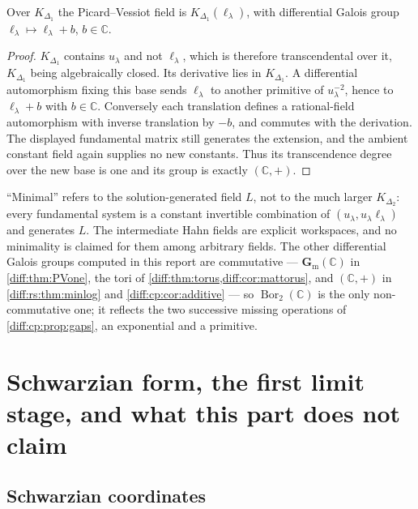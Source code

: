 \documentclass[11pt,letterpaper]{article}
\numberwithin{equation}{section}
\theoremstyle{definition}
\theoremstyle{remark}
\newcommand{\C}{\mathbb C}
\newcommand{\gm}{\mathbf G_{\mathrm m}}
\newcommand{\Bor}{\operatorname{Bor}}
\begin{document}
\begin{corollary}
\label{diff:cp:cor:additive}
Over $K_{\Delta_{1}}$ the Picard--Vessiot field is $K_{\Delta_{1}}(\ell_{\lambda})$,
with differential Galois group $\ell_{\lambda}\mapsto\ell_{\lambda}+b$, $b\in\C$.
\end{corollary}
\begin{proof}
$K_{\Delta_{1}}$ contains $u_{\lambda}$ and not $\ell_{\lambda}$, which is therefore
transcendental over it, $K_{\Delta_{1}}$ being algebraically closed. Its
derivative lies in $K_{\Delta_{1}}$. A differential automorphism
fixing this base sends $\ell_\lambda$ to another primitive of
$u_\lambda^{-2}$, hence to $\ell_\lambda+b$ with $b\in\C$.
Conversely each translation defines a rational-field automorphism
with inverse translation by $-b$, and commutes with the derivation.
The displayed fundamental matrix still generates the extension,
and the ambient constant field again supplies no new constants.
Thus its transcendence degree over the new base is one and its
group is exactly $(\C,+)$.
\end{proof}

\begin{remark}
\label{diff:cp:rem:pvscope}
``Minimal'' refers to the solution-generated field $L$, not to the much larger
$K_{\Delta_{2}}$: every fundamental system is a constant invertible
combination of $(u_{\lambda},u_{\lambda}\ell_{\lambda})$ and generates $L$. The
intermediate Hahn fields are explicit workspaces, and no minimality is claimed
for them among arbitrary fields. The other differential Galois groups computed
in this report are commutative --- $\gm(\C)$ in \cref{diff:thm:PVone}, the tori
of \cref{diff:thm:torus,diff:cor:mattorus}, and $(\C,+)$ in
\cref{diff:rs:thm:minlog} and \cref{diff:cp:cor:additive} --- so
$\Bor_{2}(\C)$ is the only non-commutative one; it reflects the two successive
missing operations of \cref{diff:cp:prop:gaps}, an exponential and a primitive.
\end{remark}

\section{Schwarzian form, the first limit stage, and what this part does not claim}
\label{diff:cp:sec:schwarzian}

\subsection{Schwarzian coordinates}
\label{diff:cp:sub:schwarzian}
\end{document}

